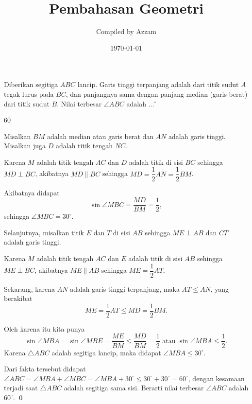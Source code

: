 \documentclass[11pt]{scrartcl}
\begin{document}
	\title{Pembahasan Geometri} %
	\date{\today}
	\author{Compiled by Azzam}
	\maketitle
	\newpage

	\begin{soalbaru}
		Diberikan segitiga $ABC$ lancip. Garis tinggi terpanjang adalah dari titik sudut $A$ tegak
			lurus pada $BC$, dan panjangnya sama dengan panjang median (garis berat) dari titik sudut $B$.
			Nilai terbesar $\angle ABC$ adalah $\dots^\circ$
			
			\begin{jawaban}
			60
			\end{jawaban}
			\begin{solusi}
			Misalkan $BM$ adalah median atau garis berat dan $AN$ adalah garis tinggi. Misalkan juga $D$ adalah titik tengah $NC$.
			
			Karena $M$ adalah titik tengah $AC$ dan $D$ adalah titik di sisi $BC$ sehingga $MD \perp BC$, akibatnya $MD \parallel BC$ sehingga $MD=\dfrac{1}{2}AN=\dfrac{1}{2}BM$.
			
			Akibatnya didapat $$\sin \angle MBC = \dfrac{MD}{BM} = \dfrac{1}{2},$$ sehingga $\angle MBC = 30^\circ$.
			
			Selanjutnya, misalkan titik $E$ dan $T$ di sisi $AB$ sehingga $ME \perp AB$ dan $CT$ adalah garis tinggi.
			
			Karena $M$ adalah titik tengah $AC$ dan $E$ adalah titik di sisi $AB$ sehingga $ME \perp BC$, akibatnya $ME \parallel AB$ sehingga $ME=\dfrac{1}{2}AT$.
			
			Sekarang, karena $AN$ adalah garis tinggi terpanjang, maka $AT \le AN$, yang berakibat $$ME=\dfrac{1}{2}AT \le MD=\dfrac{1}{2}BM.$$
			
			Oleh karena itu kita punya $$\sin \angle MBA = \sin \angle MBE = \dfrac{ME}{BM} \le \dfrac{MD}{BM} = \dfrac{1}{2} \text{ atau } \sin \angle MBA \le \dfrac{1}{2}.$$ 
			Karena $\triangle ABC$ adalah segitiga lancip, maka didapat $\angle MBA \le 30^\circ$.
			
			Dari fakta tersebut didapat $\angle ABC = \angle MBA + \angle MBC = \angle MBA  + 30^\circ \le 30^\circ + 30^\circ = 60^\circ$, dengan kesamaan terjadi saat $\triangle ABC$ adalah segitiga sama sisi. Berarti nilai terbesar $\angle ABC$ adalah $60^\circ$. \qed
			\end{solusi}
	\end{soalbaru}
	
\end{document}
